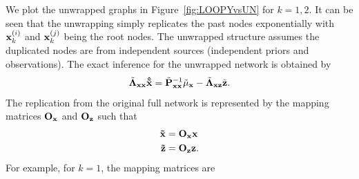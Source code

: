 We plot the unwrapped graphs in Figure~\ref{fig:LOOPYvsUN} for $k=1,2$. It can be seen that the unwrapping simply replicates the past nodes exponentially with ${\bf x}^{(i)}_{k}$ and ${\bf x}^{(j)}_{k}$ being the root nodes. The unwrapped structure assumes the duplicated nodes are from independent sources (independent priors and observations). The exact inference for the unwrapped network is obtained by
\begin{equation}
\label{eq:tildeEI}
\tilde{\bf \Lambda}_{\bf xx}{\bf{\hat{\tilde x}}}=\tilde{\bf P}_{\bf xx}^{-1}\tilde\mu_{\bf x}-\tilde{\bf \Lambda}_{\bf xz}\tilde{\bf z}.
\end{equation}
The replication from the original full network is represented by the mapping matrices ${\bf O}_{\bf x}$ and ${\bf O}_{\bf z}$ such that
\begin{equation}
\begin{split}
{\bf\tilde x}&={\bf O}_{\bf x}{\bf x} \\
{\bf\tilde z}&={\bf O}_{\bf z}{\bf z}. \\
\end{split}
\end{equation}
For example, for $k=1$, the mapping matrices are
